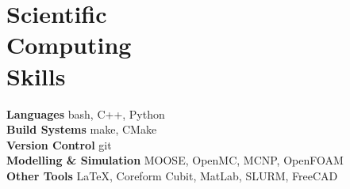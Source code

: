 \section{\mysidestyle Scientific\\Computing\\Skills}
\textbf{Languages} \hfill bash, C++, Python\vspace{.5mm}\\%
\textbf{Build Systems} \hfill make, CMake\vspace{.5mm}\\%
\textbf{Version Control} \hfill git\vspace{.5mm}\\%
\textbf{Modelling \& Simulation} \hfill MOOSE, OpenMC, MCNP, OpenFOAM \\\vspace{.5mm}%
\textbf{Other Tools} \hfill \LaTeX, Coreform Cubit, MatLab, SLURM, FreeCAD\vspace{.5mm}%

